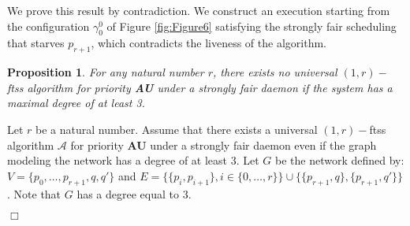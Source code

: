 \documentclass[11pt,english,letterpaper]{article}
\newtheorem{proposition}{Proposition}
\newenvironment{proof}{{\noindent\bf Proof. } }{{\hfill $\Box$}}
\begin{document}
We prove this result by contradiction. We construct an execution starting from the configuration $\gamma_{0}^{0}$ of Figure \ref{fig:Figure6} satisfying the  strongly fair scheduling that starves $p_{r+1}$, which contradicts the liveness of the algorithm. 

\begin{proposition}\label{prop:impSFPri}
For any natural number $r$, there exists no universal $(1,r)-$ftss algorithm for \emph{priority} \textbf{AU} under a strongly fair daemon if the system has a maximal degree of at least 3.
\end{proposition}

\begin{proof}
Let $r$ be a natural number. Assume that there exists a universal $(1,r)-$ftss algorithm $\mathcal{A}$  for priority \textbf{AU} under a strongly fair daemon even if the graph modeling the network has a degree of at least 3. Let $G$ be the network defined by: $V=\{p_{0},\ldots,p_{r+1},q,q'\}$ and $E=\{\{p_{i},p_{i+1}\},i\in\{0,\ldots,r\}\}\cup\{\{p_{r+1},q\},\{p_{r+1},q'\}\}$. Note that $G$ has a degree equal to $3$.


\end{proof}
\end{document}
